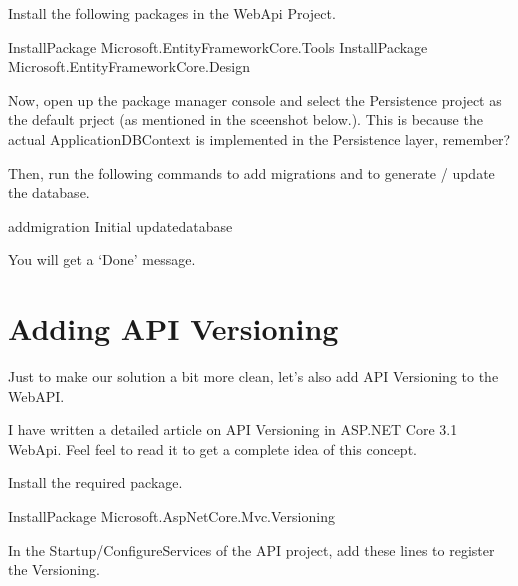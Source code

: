 \documentclass[letterpaper,10pt,english]{sphinxmanual}
\begin{document}
Install the following packages in the WebApi Project.

\begin{sphinxVerbatim}[commandchars=\\\{\}]
Install\PYGZhy{}Package Microsoft.EntityFrameworkCore.Tools
Install\PYGZhy{}Package Microsoft.EntityFrameworkCore.Design
\end{sphinxVerbatim}

Now, open up the package manager console and select the Persistence project as the default prject (as mentioned in the sceenshot below.). This is because the actual ApplicationDBContext is implemented in the Persistence layer, remember?

Then, run the following commands to add migrations and to generate / update the database.

\begin{sphinxVerbatim}[commandchars=\\\{\}]
add\PYGZhy{}migration Initial
update\PYGZhy{}database
\end{sphinxVerbatim}

\noindent{}

You will get a ‘Done’ message.


\section{Adding API Versioning}
\label{\detokenize{OnionArchitecture/details:adding-api-versioning}}
Just to make our solution a bit more clean, let’s also add API Versioning to the WebAPI.

I have written a detailed article on API Versioning in ASP.NET Core 3.1 WebApi. Feel feel to read it to get a complete idea of this concept.

Install the required package.

\begin{sphinxVerbatim}[commandchars=\\\{\}]
Install\PYGZhy{}Package Microsoft.AspNetCore.Mvc.Versioning
\end{sphinxVerbatim}

In the Startup/ConfigureServices of the API project, add these lines to register the Versioning.
\end{document}
